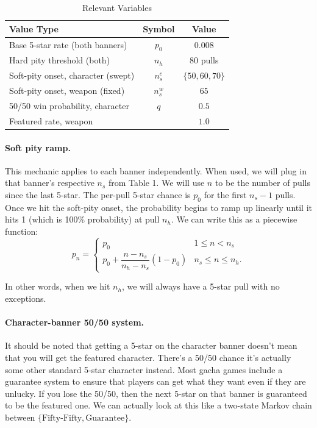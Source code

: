 \documentclass[11pt]{article}
\begin{document}
\begin{table}[H]
\centering
\caption{Relevant Variables}
\begin{tabular}{lcc}
\hline
Value Type & Symbol & Value \\
\hline
Base 5-star rate (both banners)     & $p_0$       & $0.008$            \\
Hard pity threshold (both)          & $n_h$       & $80$ pulls         \\
Soft-pity onset, character (swept)  & $n_s^c$     & $\{50, 60, 70\}$   \\
Soft-pity onset, weapon (fixed)     & $n_s^w$     & $65$               \\
50/50 win probability, character    & $q$         & $0.5$              \\
Featured rate, weapon               &             & $1.0$              \\
\hline
\end{tabular}
\end{table}

\paragraph{Soft pity ramp.} This mechanic applies to each banner independently.
When used, we will plug in that banner's respective $n_s$ from
Table 1. We will use $n$ to be the number of pulls since the last 5-star. The
per-pull 5-star chance is $p_0$ for the first $n_s - 1$ pulls. Once we hit the soft-pity onset, the probability
begins to ramp up linearly until it hits 1 (which is 100\% probability) at pull $n_h$. 
We can write this as a piecewise function:
\begin{equation}
p_n = \begin{cases}
p_0 & 1 \le n < n_s \\[4pt]
p_0 + \dfrac{n - n_s}{n_h - n_s}(1 - p_0) & n_s \le n \le n_h.
\end{cases}
\end{equation}

In other words, when we hit $n_h$, we will always have a 5-star pull with no
exceptions.

\paragraph{Character-banner 50/50 system.} It should be noted that getting a 5-star on
the character banner doesn't mean that you will get the featured
character. There's a 50/50 chance it's actually some other standard 5-star
character instead. Most gacha games include a guarantee system to ensure that players
can get what they want even if they are unlucky. If you lose the 50/50, then
the next 5-star on that banner is guaranteed to be the featured one. We can actually
look at this like a two-state Markov chain between $\{\text{Fifty-Fifty}, \text{Guarantee}\}$.
\end{document}
